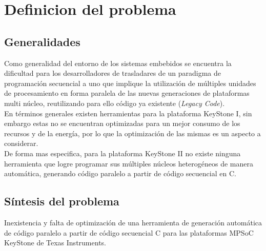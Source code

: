 
\chapter{Definicion del problema}
\label{ch:Definicion_del_problema}


\section{Generalidades}

Como generalidad del entorno de los sistemas embebidos se encuentra la dificultad para 
los desarrolladores de trasladares de un paradigma de programación secuencial a uno que 
implique la utilización de múltiples unidades de procesamiento en forma paralela de las nuevas
generaciones de plataformas multi núcleo, reutilizando para ello código ya existente (\textit{Legacy Code}).\\

En términos generales existen herramientas para la plataforma KeyStone I, sin embargo estas
no se encuentran optimizadas para un mejor consumo de los recursos y de la energía, por lo 
que la optimización de las mismas es un aspecto a considerar.\\

De forma mas especifica, para la plataforma KeyStone II no existe ninguna herramienta que logre
programar sus múltiples núcleos heterogéneos de manera automática, generando código paralelo a 
partir de código secuencial en C.



\section{Síntesis del problema}

Inexistencia y falta de optimización de una herramienta de generación automática 
de código paralelo a partir de código secuencial C para las plataformas MPSoC KeyStone de Texas Instruments.
